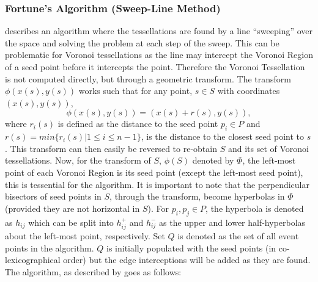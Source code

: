 \subsubsection{Fortune's Algorithm (Sweep-Line Method)}\label{tes:ssec:fort}
\citet{fortune1987sweepline} describes an algorithm where the tessellations are found by a line ``sweeping'' over the space and solving the problem at each step of the sweep. This can be problematic for Voronoi tessellations as the line may intercept the Voronoi Region of a seed point before it intercepts the point. Therefore the Voronoi Tessellation is not computed directly, but through a geometric transform. The transform $\phi(x(s),y(s))$ works such that for any point, $s \in S$ with coordinates $(x(s),y(s))$, 
\begin{equation}
  \phi(x(s),y(s)) = (x(s) + r(s), y(s)),
\end{equation}
where $r_i(s)$ is defined as the distance to the seed point $p_i \in P$ and $r(s) = min\{r_i(s) | 1 \leq i \leq n-1\}$, is the distance to the closest seed point to $s$. This transform can then easily be reversed to re-obtain $S$ and its set of Voronoi tessellations. Now, for the transform of $S$, $\phi(S)$ denoted by $\Phi$, the left-most point of each Voronoi Region is its seed point (except the left-most seed point), this is tessential for the algorithm. It is important to note that the perpendicular bisectors of seed points in $S$, through the transform, become hyperbolas in $\Phi$ (provided they are not horizontal in $S$). For $p_i,p_j\in P$, the hyperbola is denoted as $h_{ij}$ which can be split into $h^+_{ij}$ and $h^-_{ij}$ as the upper and lower half-hyperbolas about the left-most point, respectively. Set $Q$ is denoted as the set of all event points in the algorithm. $Q$ is initially populated with the seed points (in co-lexicographical order) but the edge interceptions will be added as they are found. The algorithm, as described by \citet{okabe2009spatial} goes as follows:
